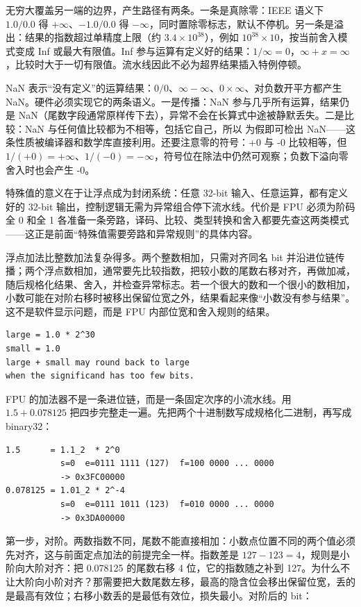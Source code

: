 无穷大覆盖另一端的边界，产生路径有两条。一条是真除零：IEEE 语义下 $1.0 / 0.0$ 得 $+\infty$、$-1.0 / 0.0$ 得 $-\infty$，同时置除零标志，默认不停机。另一条是溢出：结果的指数超过单精度上限（约 $3.4 \times 10^{38}$），例如 $10^{38} \times 10$，按当前舍入模式变成 Inf 或最大有限值。Inf 参与运算有定义好的结果：$1 / \infty = 0$，$\infty + x = \infty$，比较时大于一切有限值。流水线因此不必为超界结果插入特例停顿。

NaN 表示“没有定义”的运算结果：$0/0$、$\infty - \infty$、$0 \times \infty$、对负数开平方都产生 NaN。硬件必须实现它的两条语义。一是传播：NaN 参与几乎所有运算，结果仍是 NaN（尾数字段通常原样传下去），异常不会在长算式中途被静默丢失。二是比较：NaN 与任何值比较都为不相等，包括它自己，所以  为假即可检出 NaN——这条性质被编译器和数学库直接利用。还要注意零的符号：+0 与 -0 比较相等，但 $1/(+0) = +\infty$、$1/(-0) = -\infty$，符号位在除法中仍然可观察；负数下溢向零舍入时也会产生 -0。

特殊值的意义在于让浮点成为封闭系统：任意 32-bit 输入、任意运算，都有定义好的 32-bit 输出，控制逻辑无需为异常组合停下流水线。代价是 FPU 必须为阶码全 0 和全 1 各准备一条旁路，译码、比较、类型转换和舍入都要先查这两类模式——这正是前面“特殊值需要旁路和异常规则”的具体内容。

浮点加法比整数加法复杂得多。两个整数相加，只需对齐同名 bit 并沿进位链传播；两个浮点数相加，通常要先比较指数，把较小数的尾数右移对齐，再做加减，随后规格化结果、舍入，并检查异常标志。若一个很大的数和一个很小的数相加，小数可能在对阶右移时被移出保留位宽之外，结果看起来像“小数没有参与结果”。这不是软件显示问题，而是 FPU 内部位宽和舍入规则的结果。

\begin{lstlisting}
large = 1.0 * 2^30
small = 1.0
large + small may round back to large
when the significand has too few bits.
\end{lstlisting}

FPU 的加法器不是一条进位链，而是一条固定次序的小流水线。用 $1.5 + 0.078125$ 把四步完整走一遍。先把两个十进制数写成规格化二进制，再写成 binary32：

\begin{lstlisting}
1.5      = 1.1_2  * 2^0
           s=0  e=0111 1111 (127)  f=100 0000 ... 0000
           -> 0x3FC00000
0.078125 = 1.01_2 * 2^-4
           s=0  e=0111 1011 (123)  f=010 0000 ... 0000
           -> 0x3DA00000
\end{lstlisting}

第一步，对阶。两数指数不同，尾数不能直接相加：小数点位置不同的两个值必须先对齐，这与前面定点加法的前提完全一样。指数差是 $127 - 123 = 4$，规则是小阶向大阶对齐：把 0.078125 的尾数右移 4 位，它的指数随之补到 127。为什么不让大阶向小阶对齐？那需要把大数尾数左移，最高的隐含位会移出保留位宽，丢的是最高有效位；右移小数丢的是最低有效位，损失最小。对阶后的 bit：

